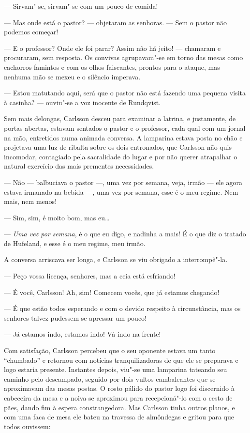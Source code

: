 --- Sirvam"-se, sirvam"-se com um pouco de comida! 

--- Mas onde está o pastor? --- objetaram as senhoras. --- Sem o pastor não podemos
começar!

 --- E o professor? Onde ele foi parar? Assim não há jeito! ---
 chamaram e procuraram, sem resposta. Os convivas agrupavam"-se em torno das
 mesas como cachorros famintos e com os olhos faiscantes, prontos para o ataque,
 mas nenhuma mão se mexeu e o silêncio imperava. 
 
--- Estou matutando aqui, será  que o pastor não está fazendo 
 uma pequena visita à casinha? --- ouviu"-se a voz inocente de Rundqvist.

 Sem mais delongas, Carlsson desceu para examinar a latrina, e justamente, de
 portas abertas, estavam sentados o pastor e o professor, cada qual com um jornal
 na mão, entretidos numa animada conversa. A lamparina estava posta no chão e
 projetava uma luz de ribalta sobre os dois entronados, que Carlsson não quis
 incomodar, contagiado pela sacralidade do lugar e por não querer
 atrapalhar o natural exercício das mais prementes necessidades.

--- Não --- balbuciava o pastor ---, uma vez por semana, veja, irmão --- ele agora
estava irmanado na bebida ---, uma vez por semana, esse é o meu regime. Nem mais,
nem menos!

--- Sim, sim, é moito bom, mas eu\ldots{}

--- \textit{Uma vez por semana}, é o que eu digo, e nadinha a mais! É o que diz
o tratado de Hufeland, e esse é o meu regime, meu irmão.

A conversa arriscava ser longa, e Carlsson se viu obrigado a interrompê"-la.

--- Peço vossa licença, senhores, mas a ceia está esfriando!

--- É você, Carlsson! Ah, sim! Comecem vocês, que já estamos chegando!

--- É que estão todos esperando e com o devido respeito à
circunstância, mas os senhores talvez pudessem se apressar um pouco!

--- Já estamos indo, estamos indo! Vá indo na frente!

Com satisfação, Carlsson percebeu que o seu oponente estava um tanto ``chumbado'' e
retornou com notícias tranquilizadoras de que ele  se preparava
e logo estaria presente. Instantes depois, viu"-se uma lamparina tateando seu
caminho pelo descampado, seguido por dois vultos cambaleantes que se aproximavam
das mesas postas. O rosto pálido do pastor logo foi discernido à cabeceira da
mesa e a noiva se aproximou para recepcioná"-lo com o cesto de pães, dando fim à
espera constrangedora. Mas Carlsson tinha outros planos, e com uma faca de mesa
ele bateu na travessa de almôndegas e gritou para que todos ouvissem: 

